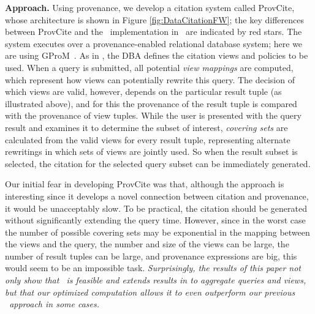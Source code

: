 
\textbf{Approach.} Using provenance, we develop a citation system called ProvCite, whose architecture is shown in Figure \ref{fig:DataCitationFW}; the key differences between ProvCite and the \rba\ implementation in~\cite{wu2018data} are indicated by red stars. The system executes over a provenance-enabled relational database system; here we are using GProM~\cite{arab2018gprom}.
As in \cite{wu2018data}, the DBA defines the citation views and policies to be used.  When a query is submitted, all potential {\em view mappings} are computed, which represent how views can potentially rewrite this query.  The decision of which views are valid, however, depends on the particular result tuple (as illustrated above), and for this the provenance of the result tuple is compared with the provenance of view tuples. While the user is presented with the query result and examines it to determine the subset of interest, \textit{covering sets} are calculated from the valid views for every result tuple, representing alternate rewritings in which sets of views are jointly used. So when the result subset is selected, the citation for the selected query subset can be immediately generated.   

Our initial fear in developing ProvCite was that, although the approach is interesting since it develops a novel connection between citation and provenance, it would be unacceptably slow.
To be practical, the citation should be generated without significantly extending the query time.
However, since in the worst case the number of possible covering sets may be exponential in the mapping between the views and the query, the number and size of the views can be large, the number of result tuples can be large, and provenance expressions are big, this would seem to be an impossible task.  \textit{Surprisingly, the results of this paper not only show that \pba\ is feasible and extends results in \cite{wu2018data} to aggregate queries and views, but that our optimized computation allows it to even outperform our previous \rba\ approach in some cases.}

